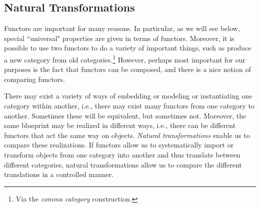 \documentclass[a4paper]{book}
\theoremstyle{definition}
\theoremstyle{definition}
\theoremstyle{definition}
\theoremstyle{theorem}
\theoremstyle{definition}
\begin{document}
\subsection{Natural Transformations}
Functors are important for many reasons. In particular, as we will see below, special ``universal" properties are given in terms of functors. Moreover, it is possible to use two functors to do a variety of important things, such as produce a new category from old categories.\footnote{Via the \textit{comma category} construction.} However, perhaps most important for our purposes is the fact that functors can be composed, and there is a nice notion of comparing functors.\par  
There may exist a variety of ways of embedding or modeling or instantiating one category within another, i.e., there may exist many functors from one category to another. Sometimes these will be equivalent, but sometimes not. Moreover, the same blueprint may be realized in different ways, i.e., there can be different functors that act the same way on objects. \textit{Natural transformations} enable us to compare these realizations. If functors allow us to systematically import or transform objects from one category into another and thus translate between different categories, natural transformations allow us to compare the different translations in a controlled manner.  
\end{document}
